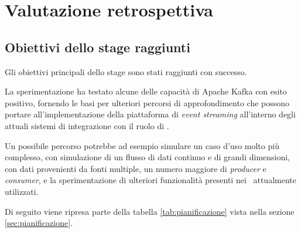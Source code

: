 \chapter{Valutazione retrospettiva}

%
%
%
%
%
%

\section{Obiettivi dello stage raggiunti}

Gli obiettivi principali dello stage sono stati raggiunti con successo.

La sperimentazione ha testato alcune delle capacità di Apache Kafka con esito positivo, fornendo le basi per ulteriori percorsi di approfondimento che possono portare all'implementazione della piattaforma di \textit{event streaming} all'interno degli attuali sistemi di integrazione con il ruolo di \middleware.

Un possibile percorso potrebbe ad esempio simulare un caso d'uso molto più complesso, con simulazione di un flusso di dati continuo e di grandi dimensioni, con dati provenienti da fonti multiple, un numero maggiore di \textit{producer} e \textit{consumer}, e la sperimentazione di ulteriori funzionalità presenti nei \middleware\ attualmente utilizzati.

\bigskip\noindent
Di seguito viene ripresa parte della tabella \ref{tab:pianificazione} vista nella sezione \ref{sec:pianificazione}.


